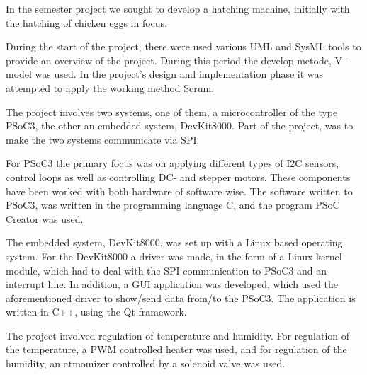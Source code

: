 In the semester project we sought to develop a hatching machine, initially with the hatching of chicken eggs in focus.

During the start of the project, there were used various UML and SysML tools to provide an overview of the project. During this period the develop metode, V - model  was used. In the project's design and implementation phase it was attempted to apply the working method Scrum.

The project involves two systems, one of them, a microcontroller of the type PSoC3, the other an embedded system, DevKit8000. Part of the project, was to make the two systems communicate via SPI.

For PSoC3 the primary focus was on applying different types of I2C sensors, control loops as well as controlling DC- and stepper motors. These components have been worked with both hardware of software wise. The software written to PSoC3, was written in the programming language C, and the program PSoC Creator was used.

The embedded system, DevKit8000, was set up with a Linux based operating system. For the DevKit8000 a driver was made, in the form of a Linux kernel module, which had to deal with the SPI communication to PSoC3 and an interrupt line. In addition, a GUI application was developed, which used the aforementioned driver to show/send data from/to the PSoC3. The application is written in C++, using the Qt framework.

The project involved regulation of temperature and humidity. For regulation of the temperature, a PWM controlled heater was used, and for regulation of the humidity, an atmomizer controlled by a solenoid valve was used.